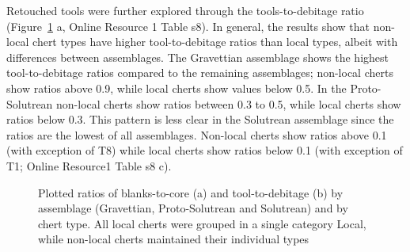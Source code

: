 \documentclass[
  a4paper,
  DIV=11,
  numbers=noendperiod]{scrreprt}
\begin{document}
Retouched tools were further explored through the tools-to-debitage
ratio (Figure~\ref{fig-ratios} a, Online Resource 1 Table s8). In
general, the results show that non-local chert types have higher
tool-to-debitage ratios than local types, albeit with differences
between assemblages. The Gravettian assemblage shows the highest
tool-to-debitage ratios compared to the remaining assemblages; non-local
cherts show ratios above 0.9, while local cherts show values below 0.5.
In the Proto-Solutrean non-local cherts show ratios between 0.3 to 0.5,
while local cherts show ratios below 0.3. This pattern is less clear in
the Solutrean assemblage since the ratios are the lowest of all
assemblages. Non-local cherts show ratios above 0.1 (with exception of
T8) while local cherts show ratios below 0.1 (with exception of T1;
Online Resource1 Table s8 c).

\begin{figure}


\caption{\label{fig-ratios}Plotted ratios of blanks-to-core (a) and
tool-to-debitage (b) by assemblage (Gravettian, Proto-Solutrean and
Solutrean) and by chert type. All local cherts were grouped in a single
category Local, while non-local cherts maintained their individual
types}

\end{figure}%
\end{document}
